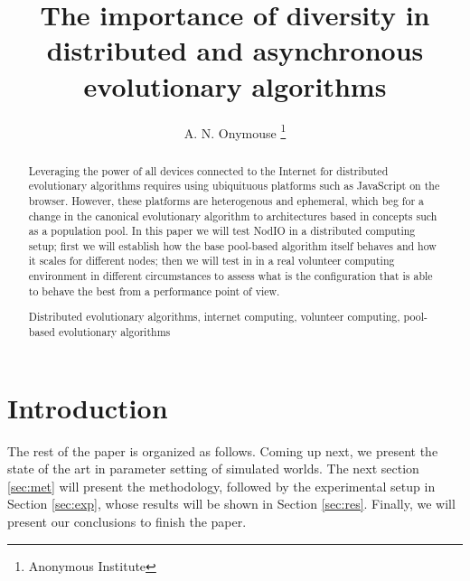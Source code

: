 \documentclass[runningheads,a4paper]{llncs}
\newcommand{\keywords}[1]{\par\addvspace\baselineskip
\noindent\keywordname\enspace\ignorespaces#1}
\begin{document}
\mainmatter  

\title{The importance of diversity in distributed and asynchronous
  evolutionary algorithms}  


\author{A. N. Onymouse%
\thanks{Anonymous Institute}}
%




\maketitle

\begin{abstract}

Leveraging the power of all devices connected to the Internet for
distributed evolutionary algorithms requires using ubiquituous
platforms such as JavaScript on the browser. However, these platforms
are heterogenous and ephemeral, which beg for a change in the canonical
evolutionary algorithm to architectures based in concepts such as a
population pool. In this paper we will test NodIO in a distributed
computing setup; first we will establish how the base pool-based algorithm itself
behaves and how it scales for different nodes; then we will test in in
a real volunteer computing environment in different circumstances to
assess what is the configuration that is able to behave the best from
a performance point of view. 

\keywords{Distributed evolutionary algorithms, internet computing,
  volunteer computing, pool-based evolutionary algorithms}
\end{abstract}

\section{Introduction}

The rest of the paper is organized as follows. Coming up next, we
present the state of the art in parameter setting of simulated
worlds. The next section \ref{sec:met} will present the methodology,
followed by the experimental setup in Section \ref{sec:exp}, whose results will be shown in Section \ref{sec:res}. Finally, we will
present our conclusions to finish the paper.
\end{document}
